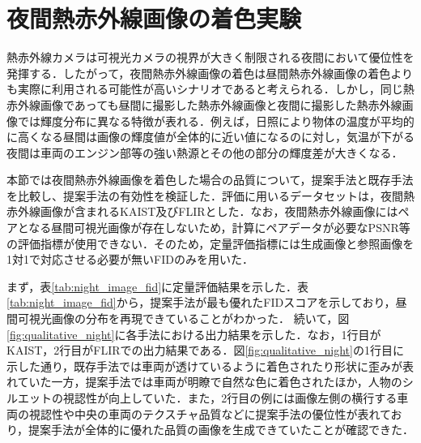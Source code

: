 \documentclass[11pt,dvipdfmx]{ujreport}
\begin{document}
\section{夜間熱赤外線画像の着色実験}
\label{sec:night_experiments}
熱赤外線カメラは可視光カメラの視界が大きく制限される夜間において優位性を発揮する．したがって，夜間熱赤外線画像の着色は昼間熱赤外線画像の着色よりも実際に利用される可能性が高いシナリオであると考えられる．しかし，同じ熱赤外線画像であっても昼間に撮影した熱赤外線画像と夜間に撮影した熱赤外線画像では輝度分布に異なる特徴が表れる．例えば，日照により物体の温度が平均的に高くなる昼間は画像の輝度値が全体的に近い値になるのに対し，気温が下がる夜間は車両のエンジン部等の強い熱源とその他の部分の輝度差が大きくなる．\par
本節では夜間熱赤外線画像を着色した場合の品質について，提案手法と既存手法を比較し、提案手法の有効性を検証した．評価に用いるデータセットは，夜間熱赤外線画像が含まれるKAIST及びFLIRとした．なお，夜間熱赤外線画像にはペアとなる昼間可視光画像が存在しないため，計算にペアデータが必要なPSNR等の評価指標が使用できない．そのため，定量評価指標には生成画像と参照画像を1対1で対応させる必要が無いFIDのみを用いた．\par
まず，表\ref{tab:night_image_fid}に定量評価結果を示した．表\ref{tab:night_image_fid}から，提案手法が最も優れたFIDスコアを示しており，昼間可視光画像の分布を再現できていることがわかった．
続いて，図\ref{fig:qualitative_night}に各手法における出力結果を示した．なお，1行目がKAIST，2行目がFLIRでの出力結果である．図\ref{fig:qualitative_night}の1行目に示した通り，既存手法では車両が透けているように着色されたり形状に歪みが表れていた一方，提案手法では車両が明瞭で自然な色に着色されたほか，人物のシルエットの視認性が向上していた．また，2行目の例には画像左側の横行する車両の視認性や中央の車両のテクスチャ品質などに提案手法の優位性が表れており，提案手法が全体的に優れた品質の画像を生成できていたことが確認できた．

\begin{table}[tb]
\centering
\caption{夜間熱赤外線画像を着色した際の定量評価結果(FID)}
\label{tab:night_image_fid}
\end{table}
\end{document}
